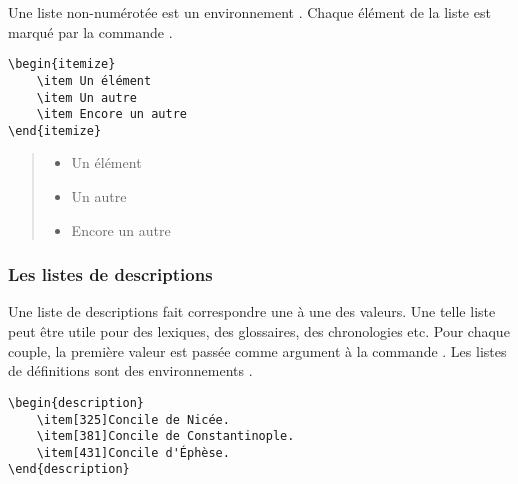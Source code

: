 Une liste non-numérotée est un environnement .
Chaque élément de la liste est marqué par la commande .

\begin{verbatim}
\begin{itemize}
	\item Un élément
	\item Un autre
	\item Encore un autre
\end{itemize}
\end{verbatim}

\begin{quotation}
\noindent\begin{itemize}
	\item Un élément
	\item Un autre
	\item Encore un autre
\end{itemize}
\end{quotation}

\subsubsection{Les listes de descriptions}

Une liste de descriptions fait correspondre une à une des valeurs. Une telle liste peut être utile pour des lexiques, des glossaires, des chronologies etc. Pour chaque couple, la première valeur est passée comme argument à la commande . Les listes de définitions sont des environnements .


\begin{verbatim}
\begin{description}
	\item[325]Concile de Nicée.
	\item[381]Concile de Constantinople.
	\item[431]Concile d'Éphèse.
\end{description}
\end{verbatim}
\begin{quotation}
\noindent\begin{description}
	\item[325]Concile de Nicée}.
	\item[381]Concile de Constantinople.
	\item[431]Concile d'Éphèse.
\end{description}
\end{quotation}

